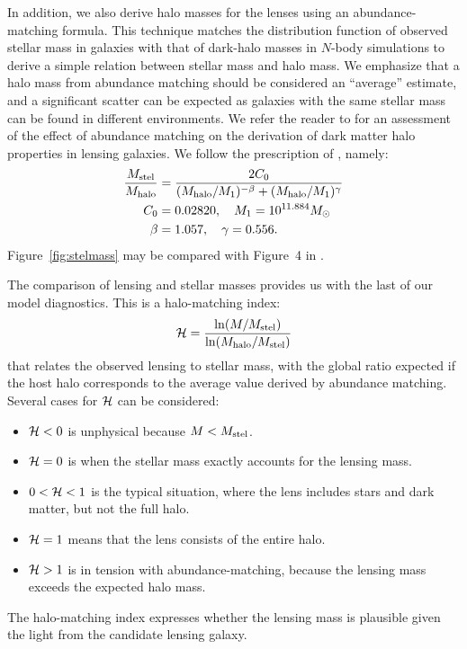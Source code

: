In addition, we also derive halo masses for the lenses using an
abundance-matching formula.  This technique matches the distribution
function of observed stellar mass in galaxies with that of dark-halo
masses in $N$-body simulations to derive a simple relation between
stellar mass and halo mass.  We emphasize that a halo mass from
abundance matching should be considered an ``average'' estimate, and a
significant scatter can be expected as galaxies with the same stellar
mass can be found in different environments. We refer the reader to
\cite{2012MNRAS.424..104L} for an assessment of the effect of
abundance matching on the derivation of dark matter halo properties in
lensing galaxies. We follow the prescription of
\citet{2010ApJ...710..903M}, namely:
\begin{equation}
\begin{aligned}
\frac{M_\text{stel}}{M_\text{halo}} &= \frac{2C_0}{(M_\text{halo}/M_1)^{-\beta} +
                                     (M_\text{halo}/M_1)^\gamma} \\
C_0 &= 0.02820, \quad M_1 = 10^{11.884} M_\odot \\
\beta &= 1.057, \quad \gamma = 0.556.
\end{aligned}
\end{equation}
Figure~\ref{fig:stelmass} may be compared with Figure~4 in
\cite{2011ApJ...734...69M}.

The comparison of lensing and stellar masses provides us with the last
of our model diagnostics.  This is a halo-matching index:
\begin{equation}
\mathcal{H} = \frac{\ln(M/M_\text{stel})}{\ln(M_\text{halo}/M_\text{stel})}
\end{equation}
that relates the observed lensing to stellar mass, with the
global ratio expected if the host halo corresponds to the
average value derived by abundance matching. Several cases
for $\mathcal{H}$ can be considered:
\begin{itemize}
\item $\mathcal{H} < 0$ is unphysical because $M<M_\text{stel}$.
\item $\mathcal{H} = 0$ is when the stellar mass exactly accounts for the
  lensing mass.
\item $0 < \mathcal{H} < 1$ is the typical situation, where the lens
  includes stars and dark matter, but not the full halo.
\item $\mathcal{H} = 1$ means that the lens consists of the entire halo.
\item $\mathcal{H} > 1$ is in tension with abundance-matching, because the
  lensing mass exceeds the expected halo mass.
\end{itemize}
The halo-matching index expresses whether the lensing mass is
plausible given the light from the candidate lensing galaxy.



